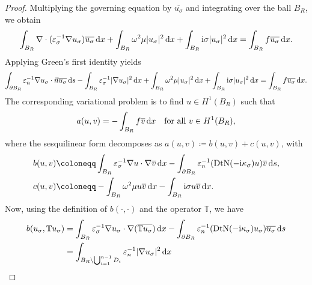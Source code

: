 \documentclass[12pt,reqno]{amsart}
\numberwithin{equation}{section}
\begin{document}
\begin{proof}

Multiplying the governing equation by $\overline{u_\sigma}$ and integrating over the ball $B_R$, we obtain
\begin{equation*}\label{eq:well-posedness-system}
    \int_{B_{R}} \nabla \cdot (\varepsilon_\sigma^{-1} \nabla u_\sigma) \overline{u_\sigma} \, {\rm d}x
    + \int_{B_{R}} \omega^2 \mu |u_\sigma|^2 \, {\rm d}x
    + \int_{B_{R}} {\rm i} \sigma |u_\sigma|^2 \, {\rm d}x
    = \int_{B_{R}} f \overline{u_\sigma} \, {\rm d}x.
\end{equation*}
Applying Green's first identity yields
\begin{equation*}
    \int_{\partial B_{R}} \varepsilon_n^{-1}\nabla u_\sigma\cdot\vec{n} \overline{u_\sigma} \, {\rm d}s
    - \int_{B_{R}} \varepsilon_\sigma^{-1} |\nabla u_\sigma|^2 \, {\rm d}x
    + \int_{B_{R}} \omega^2 \mu |u_\sigma|^2 \, {\rm d}x
    + \int_{B_{R}} {\rm i} \sigma |u_\sigma|^2 \, {\rm d}x
    = \int_{B_{R}} f \overline{u_\sigma} \, {\rm d}x.
\end{equation*}
The corresponding variational problem is to find $u \in H^1(B_R)$ such that 
\begin{equation}\label{eq:well-posedness-system}
    a(u,v) = - \int_{B_{R}} f \overline{v} \, {\rm d}x \quad \text{for all } v \in H^1(B_R),
\end{equation}
where the sesquilinear form decomposes as $a(u,v) \coloneqq b(u,v) + c(u,v)$, with
\begin{align*}
    b(u,v) &\coloneqq \int_{B_{R}} \varepsilon_\sigma^{-1} \nabla u \cdot \nabla \overline{v} \, {\rm d}x
    - \int_{\partial B_{R}} \varepsilon_n^{-1} (\operatorname{DtN}(-{\rm i}\kappa_\sigma) u) \overline{v} \, {\rm d}s, \\
    c(u,v) &\coloneqq - \int_{B_{R}} \omega^2 \mu u \overline{v} \, {\rm d}x
    - \int_{B_{R}} {\rm i} \sigma u \overline{v} \, {\rm d}x.
\end{align*}
Now, using the definition of \(b(\cdot,\cdot)\) and the operator \(\mathbb{T}\), we have
\begin{align*}
    b(u_\sigma, \mathbb{T}u_\sigma) &=
    \int_{B_{R}} \varepsilon_\sigma^{-1} \nabla u_\sigma \cdot \nabla (\overline{\mathbb{T}u_\sigma}) \, {\rm d}x
    - \int_{\partial B_{R}} \varepsilon_n^{-1} (\operatorname{DtN}(-{\rm i}\kappa_\sigma) u_\sigma) \overline{u_\sigma} \, {\rm d}s \\
    &= \int_{B_{R} \setminus \bigcup_{i=1}^{n-1} D_i} \varepsilon_n^{-1} |\nabla u_\sigma|^2 \, {\rm d}x \\

\end{align*}
\end{proof}
\end{document}
